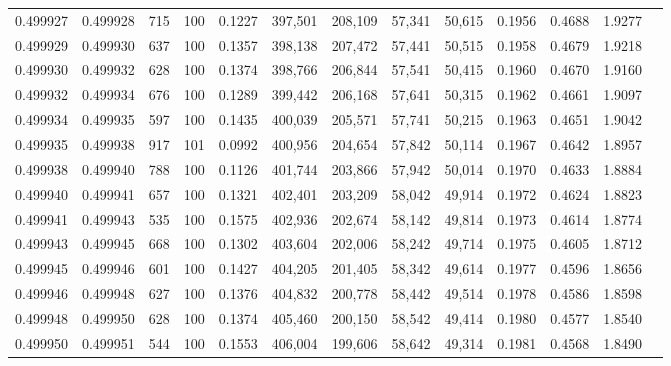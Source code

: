 \begin{tabular}{rrrrrrrrrrrrr}
0.499927 & 0.499928 &   715 & 100 &                                     0.1227 & 397,501 & 208,109 &  57,341 &  50,615 & 0.1956 & 0.4688 & 1.9277 \\
0.499929 & 0.499930 &   637 & 100 &                                     0.1357 & 398,138 & 207,472 &  57,441 &  50,515 & 0.1958 & 0.4679 & 1.9218 \\
0.499930 & 0.499932 &   628 & 100 &                                     0.1374 & 398,766 & 206,844 &  57,541 &  50,415 & 0.1960 & 0.4670 & 1.9160 \\
0.499932 & 0.499934 &   676 & 100 &                                     0.1289 & 399,442 & 206,168 &  57,641 &  50,315 & 0.1962 & 0.4661 & 1.9097 \\
0.499934 & 0.499935 &   597 & 100 &                                     0.1435 & 400,039 & 205,571 &  57,741 &  50,215 & 0.1963 & 0.4651 & 1.9042 \\
0.499935 & 0.499938 &   917 & 101 &                                     0.0992 & 400,956 & 204,654 &  57,842 &  50,114 & 0.1967 & 0.4642 & 1.8957 \\
0.499938 & 0.499940 &   788 & 100 &                                     0.1126 & 401,744 & 203,866 &  57,942 &  50,014 & 0.1970 & 0.4633 & 1.8884 \\
0.499940 & 0.499941 &   657 & 100 &                                     0.1321 & 402,401 & 203,209 &  58,042 &  49,914 & 0.1972 & 0.4624 & 1.8823 \\
0.499941 & 0.499943 &   535 & 100 &                                     0.1575 & 402,936 & 202,674 &  58,142 &  49,814 & 0.1973 & 0.4614 & 1.8774 \\
0.499943 & 0.499945 &   668 & 100 &                                     0.1302 & 403,604 & 202,006 &  58,242 &  49,714 & 0.1975 & 0.4605 & 1.8712 \\
0.499945 & 0.499946 &   601 & 100 &                                     0.1427 & 404,205 & 201,405 &  58,342 &  49,614 & 0.1977 & 0.4596 & 1.8656 \\
0.499946 & 0.499948 &   627 & 100 &                                     0.1376 & 404,832 & 200,778 &  58,442 &  49,514 & 0.1978 & 0.4586 & 1.8598 \\
0.499948 & 0.499950 &   628 & 100 &                                     0.1374 & 405,460 & 200,150 &  58,542 &  49,414 & 0.1980 & 0.4577 & 1.8540 \\
0.499950 & 0.499951 &   544 & 100 &                                     0.1553 & 406,004 & 199,606 &  58,642 &  49,314 & 0.1981 & 0.4568 & 1.8490 \\

\end{tabular}
